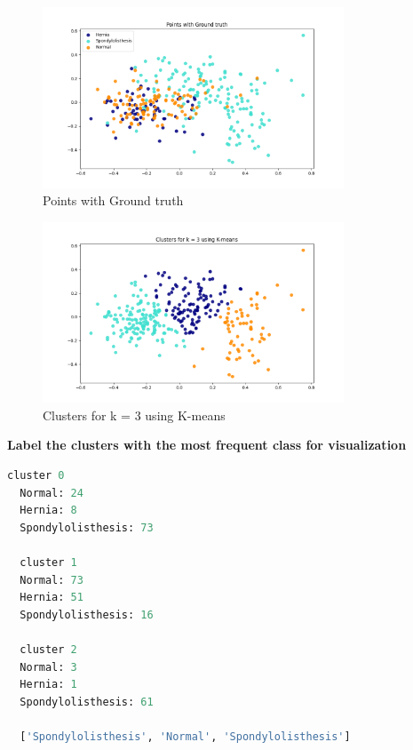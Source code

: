 \documentclass{article}
\begin{document}
\begin{figure}[H]
  \centering
  \includegraphics[width=0.8\textwidth]{images/ground_truth.png}
  \caption{Points with Ground truth}
  \label{fig:ground_truth}
\end{figure}

\begin{figure}[H]
  \centering
  \includegraphics[width=0.8\textwidth]{images/clusters.png}
  \caption{Clusters for k = 3 using K-means}
  \label{fig:clusters}
\end{figure}

\textbf{Label the clusters with the most frequent class for visualization}

\begin{lstlisting}[language=Python]
  cluster 0
  Normal: 24
  Hernia: 8
  Spondylolisthesis: 73
  
  cluster 1
  Normal: 73
  Hernia: 51
  Spondylolisthesis: 16
  
  cluster 2
  Normal: 3
  Hernia: 1
  Spondylolisthesis: 61
  
  ['Spondylolisthesis', 'Normal', 'Spondylolisthesis']
\end{lstlisting}
\end{document}
